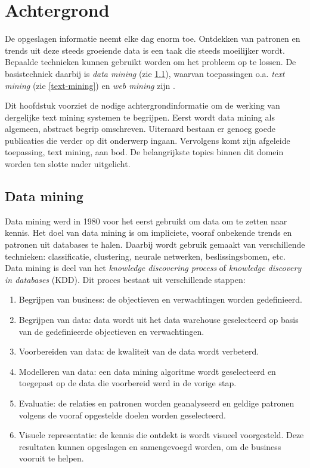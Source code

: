 \chapter{Achtergrond}

De opgeslagen informatie neemt elke dag enorm toe. Ontdekken van patronen en trends uit deze steeds groeiende data is een taak die steeds moeilijker wordt. Bepaalde technieken kunnen gebruikt worden om het probleem op te lossen. De basistechniek daarbij is \textit{data mining} (zie \ref{data-mining}), waarvan toepassingen o.a. \textit{text mining} (zie \ref{text-mining}) en \textit{web mining} zijn \cite{Nasa2012}. 

Dit hoofdstuk voorziet de nodige achtergrondinformatie om de werking van dergelijke text mining systemen te begrijpen. Eerst wordt data mining als algemeen, abstract begrip omschreven. Uiteraard bestaan er genoeg goede publicaties die verder op dit onderwerp ingaan. Vervolgens komt zijn afgeleide toepassing, text mining, aan bod. De belangrijkste topics binnen dit domein worden ten slotte nader uitgelicht. 

\section{Data mining}\label{data-mining}
Data mining werd in 1980 voor het eerst gebruikt om data om te zetten naar kennis. Het doel van data mining is om impliciete, vooraf onbekende trends en patronen uit databases te halen. Daarbij wordt gebruik gemaakt van verschillende technieken: classificatie, clustering, neurale netwerken, beslissingsbomen, etc. 
\\Data mining is deel van het \textit{knowledge discovering process} of \textit{knowledge discovery in databases} (KDD). Dit proces bestaat uit verschillende stappen:
\begin{enumerate}
	\item Begrijpen van business: de objectieven en verwachtingen worden gedefinieerd.
	\item Begrijpen van data: data wordt uit het data warehouse geselecteerd op basis van de gedefinieerde objectieven en verwachtingen.
	\item Voorbereiden van data: de kwaliteit van de data wordt verbeterd.
	\item Modelleren van data: een data mining algoritme wordt geselecteerd en toegepast op de data die voorbereid werd in de vorige stap.
	\item Evaluatie: de relaties en patronen worden geanalyseerd en geldige patronen volgens de vooraf opgestelde doelen worden geselecteerd.
	\item Visuele representatie: de kennis die ontdekt is wordt visueel voorgesteld. Deze resultaten kunnen opgeslagen en samengevoegd worden, om de business vooruit te helpen.
\end{enumerate}

